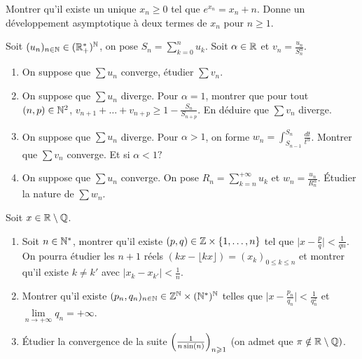 \documentclass[12pt]{article}
\begin{document}
\begin{exercise}
	Montrer qu'il existe un unique $x_{n}\geqslant0$ tel que $e^{x_{n}}=x_{n}+n$.
	Donne un développement asymptotique à deux termes de $x_{n}$ pour
	$n\geqslant1$.
\end{exercise}

\begin{exercise}
	Soit $(u_{n})_{n\in\mathbb{N}}\in(\mathbb{R}_{+}^{*})^{\mathbb{N}}$, on pose
	$S_{n}=\sum_{k=0}^{n}u_{k}$. Soit $\alpha\in\mathbb{R}$ et
	$v_{n}=\frac{u_{n}}{S_{n}^{\alpha}}$.
	\begin{enumerate}
		\item
		On suppose que $\sum u_{n}$ converge, étudier $\sum v_{n}$.
		\item
		On suppose que $\sum u_{n}$ diverge. Pour $\alpha=1$, montrer que pour
		tout $(n,p)\in\mathbb{N}^{2}$, $v_{n+1}+\dots+v_{n+p}\geqslant
		1-\frac{S_{n}}{S_{n+p}}$. En déduire que $\sum v_{n}$ diverge.
		\item
		On suppose que $\sum u_{n}$ diverge. Pour $\alpha>1$, on forme
		$w_{n}=\int_{S_{n-1}}^{S_{n}}\frac{dt}{t^{\alpha}}$. Montrer que $\sum
		v_{n}$ converge. Et si $\alpha<1?$
		\item
		On suppose que $\sum u_{n}$ converge. On pose
		$R_{n}=\sum_{k=n}^{+\infty}u_{k}$ et $w_{n}=\frac{u_{n}}{R_{n}^{\alpha}}$.
		Étudier la nature de $\sum w_{n}$.
	\end{enumerate}
\end{exercise}

\begin{exercise}
	Soit $x\in\mathbb{R}\setminus\mathbb{Q}$.
	\begin{enumerate}
		\item
		Soit $n\in\mathbb{N}^{*}$, montrer qu'il existe $(p,q)\in\mathbb{Z}\times\{1,\dots,n\}$
		tel que $\bigl\vert x-\frac{p}{q}\bigr\vert<\frac{1}{qn}$. On pourra
		étudier les $n+1$ réels $(kx-\lfloor kx\rfloor)=(x_{k})_{0\leqslant
		k\leqslant n}$ et montrer qu'il existe $k\neq k'$ avec $\vert
		x_{k}-x_{k'}\vert<\frac{1}{n}$.
		\item
		Montrer qu'il existe $(p_{n},q_{n})_{n\in\mathbb{N}}\in\mathbb{Z}^{\mathbb{N}}\times(\mathbb{N}^{*})^{\mathbb{N}}$
		telles que $\bigl\vert
		x-\frac{p_{n}}{q_{n}}\bigr\vert<\frac{1}{q_{n}^{2}}$ et
		$\lim\limits_{n\to+\infty}q_{n}=+\infty$.
		\item
		Étudier la convergence de la suite
		$\Bigl(\frac{1}{n\sin(n)}\Bigr)_{n\geqslant1}$ (on admet que
		$\pi\notin\mathbb{R}\setminus\mathbb{Q})$.
	\end{enumerate}
\end{exercise}
\end{document}
